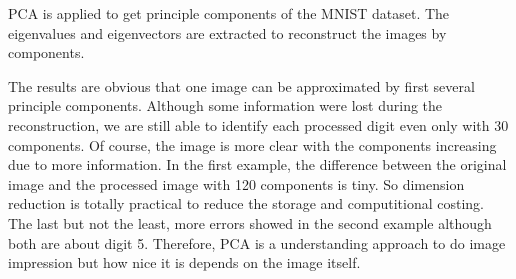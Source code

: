 \documentclass[11pt]{article}
\begin{document}
    PCA is applied to get principle components of the MNIST dataset. The
eigenvalues and eigenvectors are extracted to reconstruct the images by
components.

The results are obvious that one image can be approximated by first
several principle components. Although some information were lost during
the reconstruction, we are still able to identify each processed digit
even only with 30 components. Of course, the image is more clear with
the components increasing due to more information. In the first example,
the difference between the original image and the processed image with
120 components is tiny. So dimension reduction is totally practical to
reduce the storage and computitional costing. The last but not the
least, more errors showed in the second example although both are about
digit 5. Therefore, PCA is a understanding approach to do image
impression but how nice it is depends on the image itself.


    
    
    
    
\end{document}
